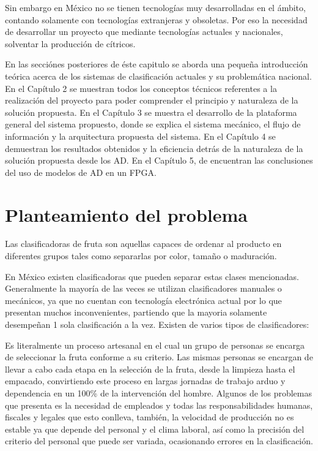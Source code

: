 \documentclass[twoside,spanish,ESP,MSc]{plantillaLabUPV}
\theoremstyle{definition}
\begin{document}
Sin embargo en México no se tienen tecnologías muy desarrolladas en el ámbito, contando solamente con tecnologías extranjeras y obsoletas. Por eso la necesidad de desarrollar un proyecto que mediante tecnologías actuales y nacionales, solventar la producción de cítricos.


En las secciónes posteriores de éste capitulo se aborda una pequeña introducción teórica acerca de los sistemas de clasificación actuales y su problemática nacional. En el Capítulo 2 se muestran todos los conceptos técnicos referentes a la realización del proyecto para poder comprender el principio y naturaleza de la solución propuesta. En el Capítulo 3 se muestra el desarrollo de la plataforma general del sistema propuesto, donde se explica el sistema mecánico, el flujo de información y la arquitectura propuesta del sistema. En el Capítulo 4 se demuestran los resultados obtenidos y la eficiencia detrás de la naturaleza de la solución propuesta desde los AD. En el Capítulo 5, de encuentran las conclusiones del uso de modelos de AD en un FPGA.




\section{Planteamiento del problema}
Las clasificadoras de fruta son aquellas capaces de ordenar al producto en diferentes grupos tales como separarlas por color, tamaño o maduración.

En México existen clasificadoras que pueden separar estas clases mencionadas. Generalmente la mayoría de las veces se utilizan clasificadores manuales o mecánicos, ya que no cuentan con tecnología electrónica actual por lo que presentan muchos inconvenientes, partiendo que la mayoria solamente desempeñan 1 sola clasificación a la vez. Existen de varios tipos de clasificadores:


 Es literalmente un proceso artesanal %
 en el cual un grupo de personas  se encarga de seleccionar la fruta conforme a su criterio. Las mismas personas se encargan de llevar a cabo cada etapa en la selección de la fruta, desde la limpieza hasta el empacado, convirtiendo este proceso en largas jornadas de trabajo arduo y dependencia en un 100\% de la intervención del hombre. Algunos de los problemas que presenta es la necesidad de empleados y todas las responsabilidades humanas, fiscales y legales que esto conlleva, también, la velocidad de producción no es estable ya que depende del personal y el clima laboral, así como la precisión del criterio del personal que puede ser variada, ocasionando errores en la clasificación.
\end{document}
